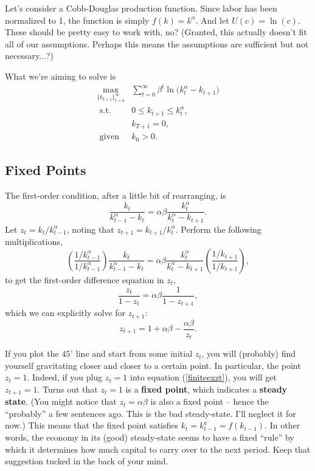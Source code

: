\documentclass[12pt]{article}
\theoremstyle{definition}
\begin{document}
Let's consider a Cobb-Douglas production function. Since labor has been normalized to 1, the function is simply $f(k)=k^{\alpha}$. And let $U(c)=\ln(c)$. These should be pretty easy to work with, no? (Granted, this actually doesn't fit all of our assumptions. Perhaps this means the assumptions are sufficient but not necessary...?)

What we're aiming to solve is 
\begin{align}
	\max_{ \{k_{t+1} \}_{t =0}^{\infty} } &\sum_{t = 0}^{\infty} \beta^t \ln\big( k_t^{\alpha} - k_{t + 1} \big) \label{spobjective}\\
	\text{ s.t. } \;\; &0 \leq k_{t+1} \leq k_t^{\alpha}, \label{spcond}\\
		&k_{T+1}=0,\\
	\text{ given} \;\; &k_0 > 0.
\end{align}


\subsection{Fixed Points}

The first-order condition, after a little bit of rearranging, is
	\[\frac{k_t}{k_{t-1}^{\alpha} - k_t}= \alpha \beta \frac{ k_t^{\alpha}}{k_t^{\alpha} - k_{t+1}}.	\]
Let $z_t = k_t / k_{t - 1}^{\alpha}$, noting that $z_{t+1} = k_{t+1} / k_{t }^{\alpha}$. Perform the following multiplications,
	\[ \left(\frac{ 1 / k^{\alpha}_{t - 1}}{1 / k^{\alpha}_{t - 1}}\right) \frac{k_t}{k_{t-1}^{\alpha} - k_t}= \alpha \beta \frac{ k_t^{\alpha}}{k_t^{\alpha} - k_{t+1}} \left( \frac{1/k_{t + 1}}{1 / k_{t + 1}}\right),	\]
	to get the first-order difference equation in $z_t$, 
	\[
		\frac{z_t}{1 -z_t} = \alpha \beta \frac{  1}{1- z_{t+1}},
	\]
which we can explicitly solve for $z_{t+1}$:
\begin{equation}
	z_{t + 1} = 1 + \alpha \beta - \frac{\alpha \beta}{z_t}. \label{finiteexzt}
\end{equation}

If you plot the $45^{\circ}$ line and start from some initial $z_t$,  you will (probably) find yourself gravitating closer and closer to a certain point. In particular, the point $z_t=1$. Indeed, if you plug $z_t=1$ into equation (\ref{finiteexzt}), you will get $z_{t+1}=1$. Turns out that $z_t=1$ is a \textbf{fixed point}, which indicates a \textbf{steady state}. (You might notice that $z_t=\alpha \beta$ is also a fixed point -- hence the ``probably'' a few sentences ago. This is the bad steady-state. I'll neglect it for now.) This means that the fixed point satisfies $ k_t =  k_{t - 1}^a = f(k_{t-1})$. In other words, the economy in its (good) steady-state seems to have a fixed ``rule'' by which it determines how much capital to carry over to the next period. Keep that suggestion tucked in the back of your mind. 
\end{document}

